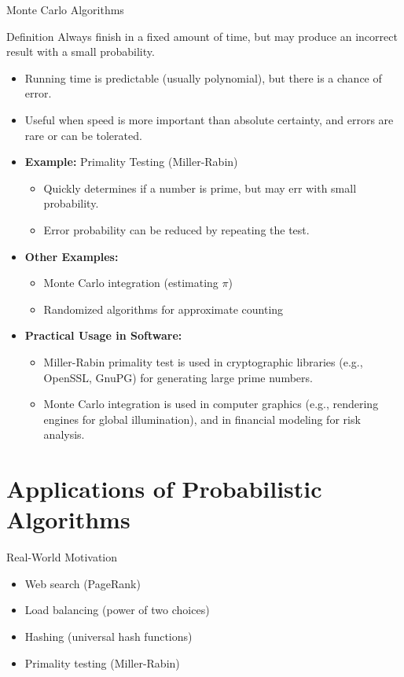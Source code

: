 \documentclass[aspectratio=169]{beamer}
\begin{document}
\begin{frame}{Monte Carlo Algorithms}
\begin{block}{Definition}
  Always finish in a fixed amount of time, but may produce an incorrect result with a small probability.
\end{block}
\pause
\begin{itemize}
\item Running time is predictable (usually polynomial), but there is a chance of error.
\pause
\item Useful when speed is more important than absolute certainty, and errors are rare or can be tolerated.
\pause
\item \textbf{Example:} Primality Testing (Miller-Rabin)
\begin{itemize}
  \item Quickly determines if a number is prime, but may err with small probability.
  \item Error probability can be reduced by repeating the test.
\end{itemize}
\pause
\item \textbf{Other Examples:}
\begin{itemize}
  \item Monte Carlo integration (estimating $\pi$)
  \item Randomized algorithms for approximate counting
\end{itemize}
\pause
\item \textbf{Practical Usage in Software:}
\begin{itemize}
  \item Miller-Rabin primality test is used in cryptographic libraries (e.g., OpenSSL, GnuPG) for generating large prime numbers.
  \item Monte Carlo integration is used in computer graphics (e.g., rendering engines for global illumination), and in financial modeling for risk analysis.
\end{itemize}
  \end{itemize}
\end{frame}

\section{Applications of Probabilistic Algorithms}

\begin{frame}{Real-World Motivation}
  \begin{itemize}
    \item Web search (PageRank)
    \item Load balancing (power of two choices)
    \item Hashing (universal hash functions)
    \item Primality testing (Miller-Rabin)
  \end{itemize}
\end{frame}
\end{document}

